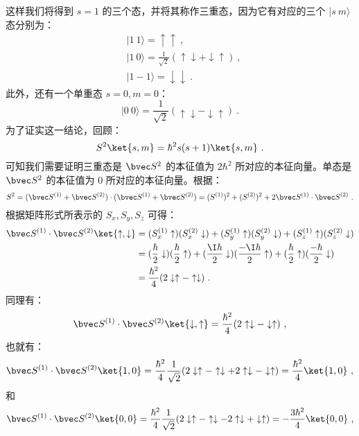 这样我们将得到 $s=1$ 的三个态，并将其称作三重态，因为它有对应的三个 $|s\ m\rangle$ 态分别为：
\begin{align}
&|1 \ 1\rangle =\uparrow\uparrow~,\\
&|1 \ 0\rangle=\frac{1}{\sqrt{2}}(\uparrow\downarrow+\downarrow\uparrow)~,\\
&|1 -1\rangle=\downarrow\downarrow~.
\end{align}
此外，还有一个单重态 $s=0,m=0$：
\begin{equation}
|0\ 0\rangle = \frac{1}{\sqrt{2}}(\uparrow\downarrow-\downarrow\uparrow)~.
\end{equation}
为了证实这一结论，回顾：
\begin{equation}
S^2\ket{s, m} = \hbar^2 s(s+1)\ket{s, m} ~.
\end{equation}
可知我们需要证明三重态是 $\bvec S^2$ 的本征值为 $2\hbar^2$ 所对应的本征向量。单态是 $\bvec S^2$ 的本征值为 $0$ 所对应的本征向量。根据：
\begin{equation}
S^2=(\bvec S^{(1)}+\bvec S^{(2)})\cdot (\bvec S^{(1)}+\bvec S^{(2)})=( S^{(1)})^2+( S^{(2)})^2+2\bvec S^{(1)}\cdot \bvec S^{(2)}~.
\end{equation}
根据矩阵形式所表示的 $S_x,S_y,S_z$ 可得：
\begin{align}
\bvec S^{(1)}\cdot \bvec S^{(2)}\ket{\uparrow,\downarrow}&=(S_x^{(1)}\uparrow)(S_x^{(2)}\downarrow)+(S_y^{(1)}\uparrow)(S_y^{(2)}\downarrow)+(S_z^{(1)}\uparrow)(S_z^{(2)}\downarrow)\\
&=(\frac{\hbar}{2}\downarrow)(\frac{\hbar}{2}\uparrow)+(\frac{\I\hbar}{2}\downarrow)(\frac{-\I\hbar}{2}\uparrow)+(\frac{\hbar}{2}\uparrow)(\frac{-\hbar}{2}\downarrow)\\
&=\frac{\hbar^2}{4}(2\downarrow\uparrow-\uparrow\downarrow)~.
\end{align}
同理有：
\begin{equation}
\bvec S^{(1)}\cdot \bvec S^{(2)}\ket{\downarrow,\uparrow} = \frac{\hbar^2}{4}(2\uparrow\downarrow-\downarrow\uparrow)~,
\end{equation}
也就有：
\begin{equation}
\bvec S^{(1)}\cdot \bvec S^{(2)}\ket{1,0}=\frac{\hbar^2}{4}\frac{1}{\sqrt{2}}(2\downarrow\uparrow-\uparrow\downarrow+2\uparrow\downarrow-\downarrow\uparrow)=\frac{\hbar^2}{4}\ket{1,0} ~,
\end{equation}
和
\begin{equation}
\bvec S^{(1)}\cdot \bvec S^{(2)}\ket{0,0}=\frac{\hbar^2}{4}\frac{1}{\sqrt{2}}(2\downarrow\uparrow-\uparrow\downarrow-2\uparrow\downarrow+\downarrow\uparrow)=-\frac{3\hbar^2}{4}\ket{0,0} ~,
\end{equation}
